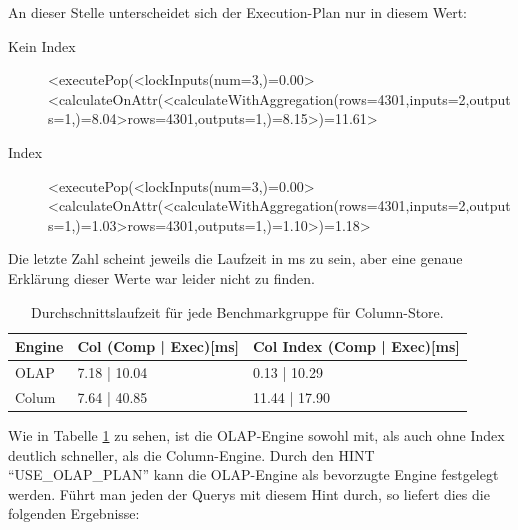An dieser Stelle unterscheidet sich der Execution-Plan nur in diesem Wert:
\begin{description}
    \item[Kein Index] <executePop(<lockInputs(num=3,)=0.00><calculateOnAttr(<calculateWithAggregation(rows=4301,inputs=2,outputs=1,)=8.04>rows=4301,outputs=1,)=8.15>)=11.61>
    \item[Index]      <executePop(<lockInputs(num=3,)=0.00><calculateOnAttr(<calculateWithAggregation(rows=4301,inputs=2,outputs=1,)=1.03>rows=4301,outputs=1,)=1.10>)=1.18>
\end{description}

Die letzte Zahl scheint jeweils die Laufzeit in ms zu sein, aber eine genaue Erklärung dieser Werte war leider nicht zu finden.

\begin{table}[H]
    \centering
    \begin{tabularx}{14cm}{lXX}
        \toprule
        Engine              & Col (Comp | Exec)[ms]                 & Col Index (Comp | Exec)[ms]     \\
        \toprule
        OLAP                & 7.18 | 10.04          & 0.13  | 10.29         \\
        Colum               & 7.64 | 40.85          & 11.44 | 17.90          \\   
        \bottomrule
    \end{tabularx}
	\caption{Durchschnittslaufzeit für jede Benchmarkgruppe für Column-Store.}
    \label{tab:olap}
\end{table}

Wie in Tabelle \ref{tab:olap} zu sehen, ist die OLAP-Engine sowohl mit, als auch ohne Index deutlich schneller, als die Column-Engine. Durch den HINT \enquote{USE\_OLAP\_PLAN} kann die OLAP-Engine als bevorzugte Engine festgelegt werden. Führt man jeden der Querys mit diesem Hint durch, so liefert dies die folgenden Ergebnisse:

\begin{figure} 
\end{figure}

